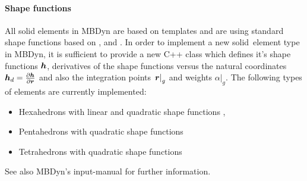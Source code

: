 \paragraph{Shape functions}
All solid elements in MBDyn are based on templates and are using standard shape functions based on \cite{BATHE2016}, \cite{DHONDT2004} and \cite{CODEASTERR30301}.
In order to implement a new solid~element type in MBDyn, it is sufficient to provide a new C++ class which defines it's shape functions $\bm{h}$,
derivatives of the shape functions versus the natural coordinates $\bm{h}_d=\frac{\partial \bm{h}}{\partial \bm{r}}$ and also the integration points $\left.\bm{r}\right\vert_g$ and weights $\left.\alpha\right\vert_g$.
The following types of elements are currently implemented:
\begin{itemize}
\item Hexahedrons with linear and quadratic shape functions \cite{BATHE2016}, \cite{DHONDT2004}
\item Pentahedrons with quadratic shape functions \cite{CODEASTERR30301}
\item Tetrahedrons with quadratic shape functions \cite{CODEASTERR30301}
\end{itemize}
See also MBDyn's input-manual for further information.

